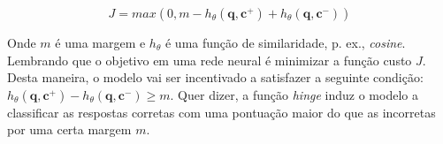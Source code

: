 \begin{equation}
J = max(0, m - h_{\theta}(\bm{q}, \bm{c^{+}}) + h_{\theta}(\bm{q}, \bm{c^{-}}))
\end{equation}

Onde $m$ é uma margem e $h_{\theta}$ é uma função de similaridade, p. ex., \textit{cosine}. Lembrando que o objetivo em uma rede neural é minimizar a função custo $J$. Desta maneira, o modelo vai ser incentivado a satisfazer a seguinte condição: $h_{\theta}(\bm{q}, \bm{c^{+}}) - h_{\theta}(\bm{q}, \bm{c^{-}}) \geq m$. Quer dizer, a função \textit{hinge} induz o modelo a classificar as respostas corretas com uma pontuação maior do que as incorretas por uma certa margem $m$. 




